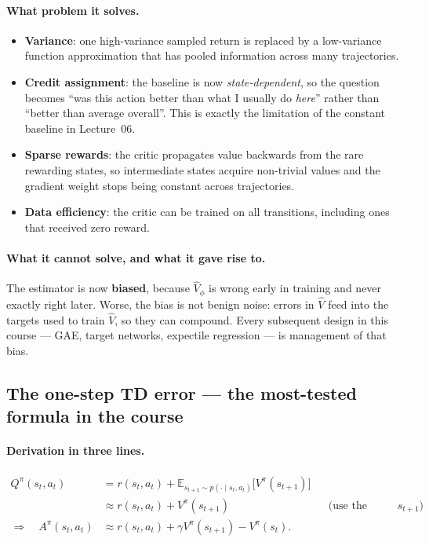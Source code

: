\documentclass[11pt,a4paper]{article}
\begin{document}
\paragraph{What problem it solves.}
\begin{itemize}
\item \textbf{Variance}: one high-variance sampled return is replaced by a
low-variance function approximation that has pooled information across many
trajectories.
\item \textbf{Credit assignment}: the baseline is now \emph{state-dependent},
so the question becomes ``was this action better than what I usually do
\emph{here}'' rather than ``better than average overall''. This is exactly the
limitation of the constant baseline in Lecture~06.
\item \textbf{Sparse rewards}: the critic propagates value backwards from the
rare rewarding states, so intermediate states acquire non-trivial values and
the gradient weight stops being constant across trajectories.
\item \textbf{Data efficiency}: the critic can be trained on all transitions,
including ones that received zero reward.
\end{itemize}

\paragraph{What it cannot solve, and what it gave rise to.} The estimator is
now \textbf{biased}, because $\hat V_\phi$ is wrong early in training and
never exactly right later. Worse, the bias is not benign noise: errors in
$\hat V$ feed into the targets used to train $\hat V$, so they can compound.
Every subsequent design in this course --- GAE, target networks, expectile
regression --- is management of that bias.

\subsection{The one-step TD error --- the most-tested formula in the course}

\paragraph{Derivation in three lines.}
\begin{align}
Q^\pi(s_t,a_t) &= r(s_t,a_t)+\mathbb E_{s_{t+1}\sim p(\cdot\mid s_t,a_t)}\bigl[V^\pi(s_{t+1})\bigr]\\
&\approx r(s_t,a_t)+V^\pi(s_{t+1}) && \text{(use the single sampled $s_{t+1}$)}\\
\Rightarrow\quad A^\pi(s_t,a_t) &\approx r(s_t,a_t)+ \gamma V^\pi(s_{t+1})-V^\pi(s_t).
\end{align}
\end{document}
